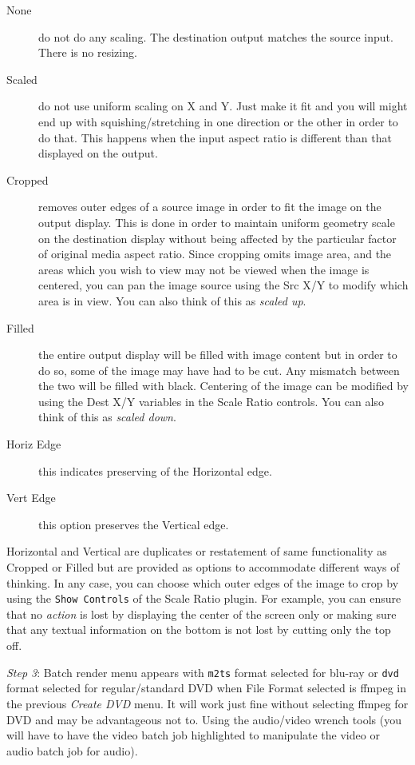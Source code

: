 \begin{description}
    \item[None] do not do any scaling.  The destination output matches the source input.  There is no resizing.
    \item[Scaled] do not use uniform scaling on X and Y.  Just make it fit and you will might end up with squishing/stretching in one direction or the other in order to do that.  This happens when the input aspect ratio is different than that displayed on the output.
    \item[Cropped] removes outer edges of a source image in order to fit the image on the output display.  This is done in order to maintain uniform geometry scale on the destination display without being affected by the particular factor of original media aspect ratio.  Since cropping omits image area, and the areas which you wish to view may not be viewed when the image is centered, you can pan the image source using the Src X/Y to modify which area is in view.  You can also think of this as \textit{scaled up}.
    \item[Filled] the entire output display will be filled with image content but in order to do so, some of the image may have had to be cut.  Any mismatch between the two will be filled with black.  Centering of the image can be modified by using the Dest X/Y variables in the Scale Ratio controls.  You can also think of this as \textit{scaled down}.
    \item[Horiz Edge] this indicates preserving of the Horizontal edge.
    \item[Vert Edge] this option preserves the Vertical edge.
\end{description}

Horizontal and Vertical are duplicates or restatement of same functionality as Cropped or Filled but are provided as options to accommodate different ways of thinking.  In any case, you can choose which outer edges of the image to crop by using the \texttt{Show Controls} of the Scale Ratio plugin.  For example, you can ensure that no \textit{action} is lost by displaying the center of the screen only or making sure that any textual information on the bottom is not lost by cutting only the top off.

\textit{Step 3}: Batch render menu appears with \texttt{m2ts} format selected for blu-ray or \texttt{dvd} format selected for regular/standard DVD when File Format selected is ffmpeg in the previous \textit{Create DVD} menu. It will work just fine without selecting ffmpeg for DVD and may be advantageous not to.  Using the audio/video wrench tools (you will have to have the video batch job highlighted to manipulate the video or audio batch job for audio).


